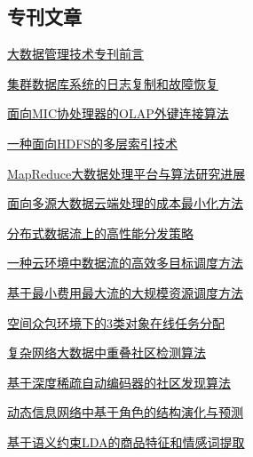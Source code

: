 \documentclass[a4paper]{article}
\begin{document}
\subsection{专刊文章}
\href{http://www.jos.org.cn/ch/reader/create_pdf.aspx?file_no=5171&year_id=2017&quarter_id=3&falg=1}{大数据管理技术专刊前言}

\href{http://www.jos.org.cn/ch/reader/create_pdf.aspx?file_no=5162&year_id=2017&quarter_id=3&falg=1}{集群数据库系统的日志复制和故障恢复}

\href{http://www.jos.org.cn/ch/reader/create_pdf.aspx?file_no=5156&year_id=2017&quarter_id=3&falg=1}{面向MIC协处理器的OLAP外键连接算法}

\href{http://www.jos.org.cn/ch/reader/create_pdf.aspx?file_no=5161&year_id=2017&quarter_id=3&falg=1}{一种面向HDFS的多层索引技术}

\href{http://www.jos.org.cn/ch/reader/create_pdf.aspx?file_no=5169&year_id=2017&quarter_id=3&falg=1}{MapReduce大数据处理平台与算法研究进展}

\href{http://www.jos.org.cn/ch/reader/create_pdf.aspx?file_no=5160&year_id=2017&quarter_id=3&falg=1}{面向多源大数据云端处理的成本最小化方法}

\href{http://www.jos.org.cn/ch/reader/create_pdf.aspx?file_no=5168&year_id=2017&quarter_id=3&falg=1}{分布式数据流上的高性能分发策略}

\href{http://www.jos.org.cn/ch/reader/create_pdf.aspx?file_no=5158&year_id=2017&quarter_id=3&falg=1}{一种云环境中数据流的高效多目标调度方法}

\href{http://www.jos.org.cn/ch/reader/create_pdf.aspx?file_no=5167&year_id=2017&quarter_id=3&falg=1}{基于最小费用最大流的大规模资源调度方法}

\href{http://www.jos.org.cn/ch/reader/create_pdf.aspx?file_no=5166&year_id=2017&quarter_id=3&falg=1}{空间众包环境下的3类对象在线任务分配}

\href{http://www.jos.org.cn/ch/reader/create_pdf.aspx?file_no=5155&year_id=2017&quarter_id=3&falg=1}{复杂网络大数据中重叠社区检测算法}

\href{http://www.jos.org.cn/ch/reader/create_pdf.aspx?file_no=5165&year_id=2017&quarter_id=3&falg=1}{基于深度稀疏自动编码器的社区发现算法}

\href{http://www.jos.org.cn/ch/reader/create_pdf.aspx?file_no=5164&year_id=2017&quarter_id=3&falg=1}{动态信息网络中基于角色的结构演化与预测}

\href{http://www.jos.org.cn/ch/reader/create_pdf.aspx?file_no=5154&year_id=2017&quarter_id=3&falg=1}{基于语义约束LDA的商品特征和情感词提取}
\end{document}
